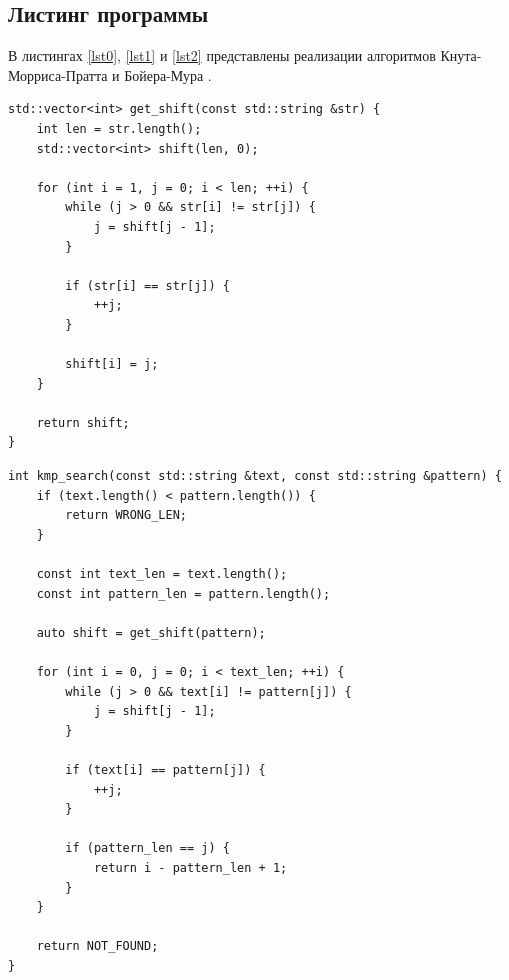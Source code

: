 \documentclass[a4paper,12pt]{article}
\begin{document}
    
\subsection{Листинг программы}

В листингах  \ref{lst0}, \ref{lst1} и \ref{lst2} представлены реализации алгоритмов Кнута-Морриса-Пратта и Бойера-Мура .

\begin{lstlisting}[label=lst0,caption=Реализация
заполнения массива сдвигов]
std::vector<int> get_shift(const std::string &str) {
    int len = str.length();
    std::vector<int> shift(len, 0);

    for (int i = 1, j = 0; i < len; ++i) {
        while (j > 0 && str[i] != str[j]) {
            j = shift[j - 1];
        }

        if (str[i] == str[j]) {
            ++j;
        }

        shift[i] = j;
    }

    return shift;
}
\end{lstlisting}

\begin{lstlisting}[label=lst1,caption=Реализация
алгоритма Кнута-Морриса-Пратта]
int kmp_search(const std::string &text, const std::string &pattern) {
    if (text.length() < pattern.length()) {
        return WRONG_LEN;
    }

    const int text_len = text.length();
    const int pattern_len = pattern.length();

    auto shift = get_shift(pattern);

    for (int i = 0, j = 0; i < text_len; ++i) {
        while (j > 0 && text[i] != pattern[j]) {
            j = shift[j - 1];
        }

        if (text[i] == pattern[j]) {
            ++j;
        }

        if (pattern_len == j) {
            return i - pattern_len + 1;
        }
    }

    return NOT_FOUND;
}
\end{lstlisting}
\end{document}
